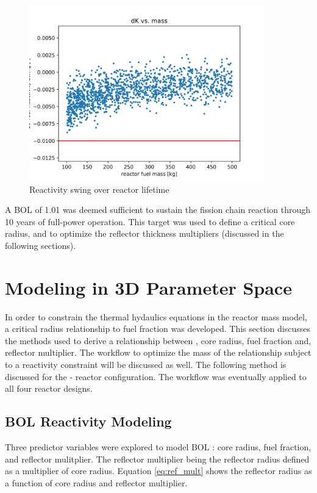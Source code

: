 \begin{figure}[h]
    \centering
    \includegraphics[width=4in]{../images/dK_vs_mass.png}
\caption{Reactivity swing over reactor lifetime}
\label{fig:delta_k_eol}
\end{figure}

A BOL \keff of 1.01 was deemed sufficient to sustain the fission chain reaction
through 10 years of full-power operation. This \keff target was used to define a
critical core radius, and to optimize the reflector thickness multipliers
(discussed in the following sections).

\section{Modeling \keff in 3D Parameter Space}\label{sec:crit_model}
In order to constrain the thermal hydaulics equations in the 
reactor mass model, a critical radius relationship to fuel fraction was developed. 
This section discusses the methods used to derive a relationship between \keff,
core radius, fuel fraction and, reflector multiplier. The workflow to
optimize the mass of the \keff relationship subject to a reactivity constraint
will be discussed as well. The following method is discussed for the \uox-\codiox
reactor configuration. The workflow was eventually applied to all four reactor
designs.

\subsection{BOL Reactivity Modeling}
Three predictor variables were explored to model BOL \keff: core radius,
fuel fraction, and reflector mulitplier. The reflector multiplier being the
reflector radius defined as a multiplier of core radius. Equation
\ref{eq:ref_mult} shows the reflector radius as a function of core radius and
reflector multiplier.

